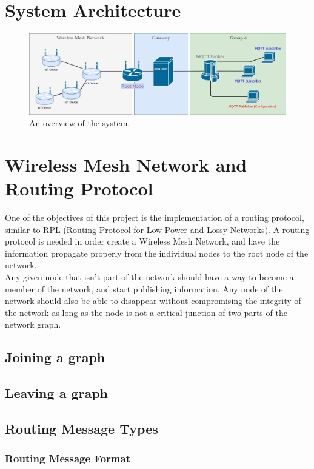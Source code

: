 \documentclass[a4paper,11pt]{article}
\begin{document}
\section{System Architecture}


\begin{figure}
  \includegraphics[width=\linewidth]{img/network-diagram-1.jpg}
  \caption{An overview of the system.}
  \label{fig:network1}
\end{figure}
\section{Wireless Mesh Network and Routing Protocol}
One of the objectives of this project is the implementation of a routing protocol, similar to RPL (Routing Protocol for Low-Power and Lossy Networks). A routing protocol is needed in order create a Wireless Mesh Network, and have the information propagate properly from the individual nodes to the root node of the network.\\

Any given node that isn't part of the network should have a way to become a member of the network, and start publishing information. Any node of the network should also be able to disappear without compromising the integrity of the network as long as the node is not a critical junction of two parts of the network graph.

\subsection{Joining a graph}
\subsection{Leaving a graph}

\subsection{Routing Message Types}
\subsubsection{Routing Message Format}
\end{document}
